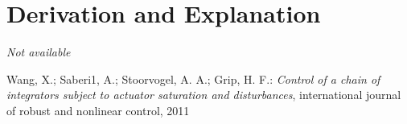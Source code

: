 \documentclass[10pt,a4paper]{article}
\begin{document}

	
	\section{Derivation and Explanation} %
	
	\textit{Not available}
	
	
	\begin{thebibliography}{10}		
		Wang, X.; Saberi1, A.; Stoorvogel, A. A.; Grip, H. F.: 
		\textit{Control of a chain of integrators subject to actuator saturation and disturbances}, international journal of robust and nonlinear control, 2011
	\end{thebibliography}
\end{document}
